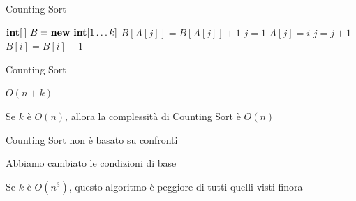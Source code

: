 \begin{frame}{Counting Sort}

\vspace{-12pt}
\begin{Procedure}
\caption[A]{\countingsort($\INTEGER[\,]\ A,\ \INTEGER\ n,\ \INTEGER\ k$)}
$\INTEGER[\,]\ B = \NEW\ \INTEGER[1 \mldots k]$\;
{
  $B[A[j]] = B[A[j]]+1$\;
}
$j = 1$\;
{
  {
    $A[j] = i$\;
    $j = j+1$\;
    $B[i] = B[i]-1$\;
  }
}
\end{Procedure}


\end{frame}%

\begin{frame}{Counting Sort}
	
\vspace{-9pt}
\begin{myboxtitle}
\BI
\item $O(n+k)$
\item Se $k$ è $O(n)$, allora la complessità di Counting Sort è $O(n)$
\EI
\end{myboxtitle}

\begin{myboxtitle}
\BI
\item Counting Sort non è basato su confronti
\item Abbiamo cambiato le condizioni di base 
\item Se $k$ è $O(n^3)$, questo algoritmo è peggiore di tutti quelli visti finora	
\EI
\end{myboxtitle}
\end{frame}%


